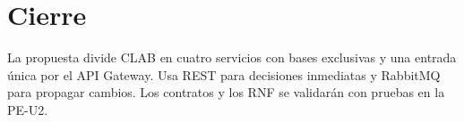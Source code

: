 \section{Cierre}
La propuesta divide CLAB en cuatro servicios con bases exclusivas y una
entrada única por el API Gateway. Usa REST para decisiones inmediatas y
RabbitMQ para propagar cambios. Los contratos y los RNF se validarán con
pruebas en la PE-U2.